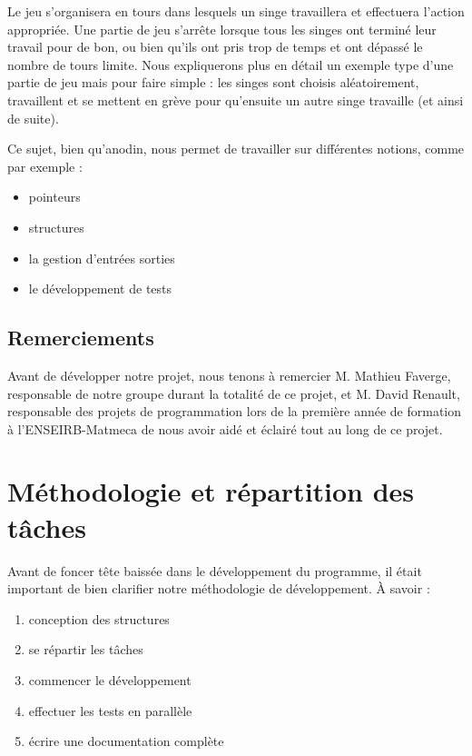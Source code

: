 \documentclass{article}
\begin{document}
Le jeu s'organisera en tours dans lesquels un singe travaillera et effectuera l'action appropriée. Une partie de jeu s'arrête lorsque tous les singes ont terminé leur travail pour de bon, ou bien qu'ils ont pris trop de temps et ont dépassé le nombre de tours limite. Nous expliquerons plus en détail un exemple type d'une partie de jeu mais pour faire simple : les singes sont choisis aléatoirement, travaillent et se mettent en grève pour qu'ensuite un autre singe travaille (et ainsi de suite).

Ce sujet, bien qu'anodin, nous permet de travailler sur différentes notions, comme par exemple :
\begin{itemize}
    \item pointeurs
    \item structures
    \item la gestion d'entrées sorties
    \item le développement de tests
\end{itemize}


\subsection{Remerciements}
\label{sct:remerciements}

Avant de développer notre projet, nous tenons à remercier M. Mathieu Faverge, responsable de notre groupe durant la totalité de ce projet, et M. David Renault, responsable des projets de programmation lors de la première année de formation à l'ENSEIRB-Matmeca de nous avoir aidé et éclairé tout au long de ce projet.



\newpage
\section{Méthodologie et répartition des tâches}
\label{sct:methodo_taches}

Avant de foncer tête baissée dans le développement du programme, il était important de bien clarifier notre méthodologie de développement. À savoir :
\begin{enumerate}
    \item conception des structures
    \item se répartir les tâches
    \item commencer le développement
    \item effectuer les tests en parallèle
    \item écrire une documentation complète
\end{enumerate}
\end{document}
